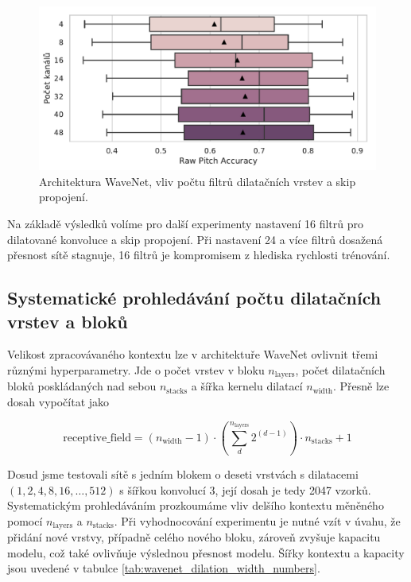 \begin{figure}[h]\centering
    \includegraphics[scale=0.6]{../img/figures/wavenet_dil_skip_channels.pdf}
\caption{Architektura WaveNet, vliv počtu filtrů dilatačních vrstev a skip propojení.}\label{obr:wavenet_dil_skip_channels}
\end{figure}

Na základě výsledků volíme pro další experimenty nastavení 16 filtrů pro dilatované konvoluce a skip propojení. Při nastavení 24 a více filtrů dosažená přesnost sítě stagnuje, 16 filtrů je kompromisem z hlediska rychlosti trénování.

\subsection{Systematické prohledávání počtu dilatačních vrstev a bloků}

Velikost zpracovávaného kontextu lze v architektuře WaveNet ovlivnit třemi různými hyperparametry. Jde o počet vrstev v bloku $n_{\mathrm{layers}}$, počet dilatačních bloků poskládaných nad sebou $n_{\mathrm{stacks}}$ a šířka kernelu dilatací $n_{\mathrm{width}}$. Přesně lze dosah vypočítat jako 

    $$\mathrm{receptive\_field} = (n_{\mathrm{width}}-1)\cdot(\sum_d^{n_{\mathrm{layers}}}{2^{(d-1)}})\cdot n_{\mathrm{stacks}}+1$$

Dosud jsme testovali sítě s jedním blokem o deseti vrstvách s dilatacemi $(1,2,4,8,16,\dots,512)$ s šířkou konvolucí 3, její dosah je tedy 2047 vzorků. Systematickým prohledáváním prozkoumáme vliv delšího kontextu měněného pomocí $n_{\mathrm{layers}}$ a $n_{\mathrm{stacks}}$. Při vyhodnocování experimentu je nutné vzít v úvahu, že přidání nové vrstvy, případně celého nového bloku, zároveň zvyšuje kapacitu modelu, což také ovlivňuje výslednou přesnost modelu. Šířky kontextu a kapacity jsou uvedené v tabulce \ref{tab:wavenet_dilation_width_numbers}.

